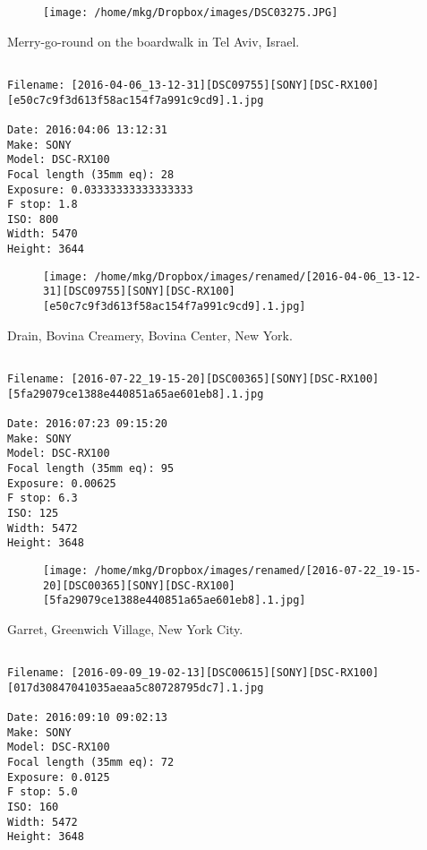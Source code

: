 \begin{figure}
\texttt{[image: /home/mkg/Dropbox/images/DSC03275.JPG]}
\end{figure}
    
\clearpage
\onecolumn
\noindent Merry-go-round on the boardwalk in Tel Aviv, Israel.
\noindent
\begin{lstlisting}

Filename: [2016-04-06_13-12-31][DSC09755][SONY][DSC-RX100][e50c7c9f3d613f58ac154f7a991c9cd9].1.jpg

Date: 2016:04:06 13:12:31
Make: SONY
Model: DSC-RX100
Focal length (35mm eq): 28
Exposure: 0.03333333333333333
F stop: 1.8
ISO: 800
Width: 5470
Height: 3644
\end{lstlisting}
\clearpage

\begin{figure}
\texttt{[image: /home/mkg/Dropbox/images/renamed/[2016-04-06\_13-12-31][DSC09755][SONY][DSC-RX100][e50c7c9f3d613f58ac154f7a991c9cd9].1.jpg]}
\end{figure}
    
\clearpage
\onecolumn
\noindent Drain, Bovina Creamery, Bovina Center, New York.
\noindent
\begin{lstlisting}

Filename: [2016-07-22_19-15-20][DSC00365][SONY][DSC-RX100][5fa29079ce1388e440851a65ae601eb8].1.jpg

Date: 2016:07:23 09:15:20
Make: SONY
Model: DSC-RX100
Focal length (35mm eq): 95
Exposure: 0.00625
F stop: 6.3
ISO: 125
Width: 5472
Height: 3648
\end{lstlisting}
\clearpage

\begin{figure}
\texttt{[image: /home/mkg/Dropbox/images/renamed/[2016-07-22\_19-15-20][DSC00365][SONY][DSC-RX100][5fa29079ce1388e440851a65ae601eb8].1.jpg]}
\end{figure}
    
\clearpage
\onecolumn
\noindent Garret, Greenwich Village, New York City.
\noindent
\begin{lstlisting}

Filename: [2016-09-09_19-02-13][DSC00615][SONY][DSC-RX100][017d30847041035aeaa5c80728795dc7].1.jpg

Date: 2016:09:10 09:02:13
Make: SONY
Model: DSC-RX100
Focal length (35mm eq): 72
Exposure: 0.0125
F stop: 5.0
ISO: 160
Width: 5472
Height: 3648
\end{lstlisting}
\clearpage

